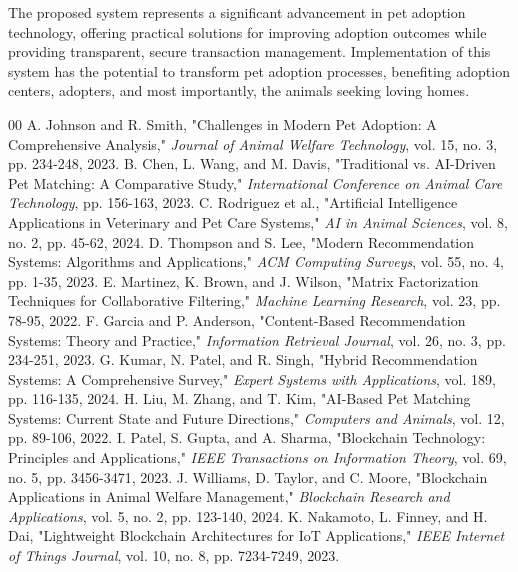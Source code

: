 \documentclass[conference]{IEEEtran}
\begin{document}
The proposed system represents a significant advancement in pet adoption technology, offering practical solutions for improving adoption outcomes while providing transparent, secure transaction management. Implementation of this system has the potential to transform pet adoption processes, benefiting adoption centers, adopters, and most importantly, the animals seeking loving homes.

\begin{thebibliography}{00}
 A. Johnson and R. Smith, "Challenges in Modern Pet Adoption: A Comprehensive Analysis," \textit{Journal of Animal Welfare Technology}, vol. 15, no. 3, pp. 234-248, 2023.
 B. Chen, L. Wang, and M. Davis, "Traditional vs. AI-Driven Pet Matching: A Comparative Study," \textit{International Conference on Animal Care Technology}, pp. 156-163, 2023.
 C. Rodriguez et al., "Artificial Intelligence Applications in Veterinary and Pet Care Systems," \textit{AI in Animal Sciences}, vol. 8, no. 2, pp. 45-62, 2024.
 D. Thompson and S. Lee, "Modern Recommendation Systems: Algorithms and Applications," \textit{ACM Computing Surveys}, vol. 55, no. 4, pp. 1-35, 2023.
 E. Martinez, K. Brown, and J. Wilson, "Matrix Factorization Techniques for Collaborative Filtering," \textit{Machine Learning Research}, vol. 23, pp. 78-95, 2022.
 F. Garcia and P. Anderson, "Content-Based Recommendation Systems: Theory and Practice," \textit{Information Retrieval Journal}, vol. 26, no. 3, pp. 234-251, 2023.
 G. Kumar, N. Patel, and R. Singh, "Hybrid Recommendation Systems: A Comprehensive Survey," \textit{Expert Systems with Applications}, vol. 189, pp. 116-135, 2024.
 H. Liu, M. Zhang, and T. Kim, "AI-Based Pet Matching Systems: Current State and Future Directions," \textit{Computers and Animals}, vol. 12, pp. 89-106, 2022.
 I. Patel, S. Gupta, and A. Sharma, "Blockchain Technology: Principles and Applications," \textit{IEEE Transactions on Information Theory}, vol. 69, no. 5, pp. 3456-3471, 2023.
 J. Williams, D. Taylor, and C. Moore, "Blockchain Applications in Animal Welfare Management," \textit{Blockchain Research and Applications}, vol. 5, no. 2, pp. 123-140, 2024.
 K. Nakamoto, L. Finney, and H. Dai, "Lightweight Blockchain Architectures for IoT Applications," \textit{IEEE Internet of Things Journal}, vol. 10, no. 8, pp. 7234-7249, 2023.
\end{thebibliography}
\end{document}
